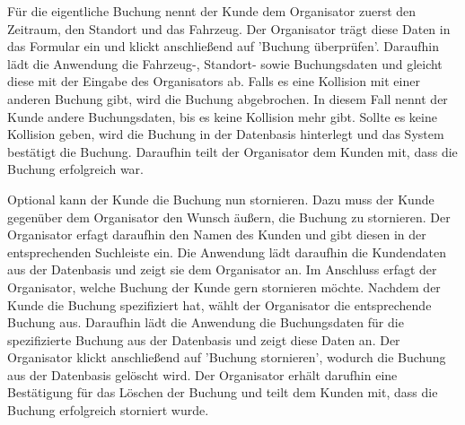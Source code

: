 Für die eigentliche Buchung nennt der Kunde dem Organisator zuerst den Zeitraum, den Standort und das Fahrzeug. Der Organisator trägt diese Daten in das Formular ein und klickt anschließend auf 'Buchung überprüfen'. Daraufhin lädt die Anwendung die Fahrzeug-, Standort- sowie Buchungsdaten und gleicht diese mit der Eingabe des Organisators ab. Falls es eine Kollision mit einer anderen Buchung gibt, wird die Buchung abgebrochen. In diesem Fall nennt der Kunde andere Buchungsdaten, bis es keine Kollision mehr gibt. Sollte es keine Kollision geben, wird die Buchung in der Datenbasis hinterlegt und das System bestätigt die Buchung. Daraufhin teilt der Organisator dem Kunden mit, dass die Buchung erfolgreich war.

Optional kann der Kunde die Buchung nun stornieren. Dazu muss der Kunde gegenüber dem Organisator den Wunsch äußern, die Buchung zu stornieren. Der Organisator erfagt daraufhin den Namen des Kunden und gibt diesen in der entsprechenden Suchleiste ein. Die Anwendung lädt daraufhin die Kundendaten aus der Datenbasis und zeigt sie dem Organisator an. Im Anschluss erfagt der Organisator, welche Buchung der Kunde gern stornieren möchte. Nachdem der Kunde die Buchung spezifiziert hat, wählt der Organisator die entsprechende Buchung aus. Daraufhin lädt die Anwendung die Buchungsdaten für die spezifizierte Buchung aus der Datenbasis und zeigt diese Daten an. Der Organisator klickt anschließend auf 'Buchung stornieren', wodurch die Buchung aus der Datenbasis gelöscht wird. Der Organisator erhält darufhin eine Bestätigung für das Löschen der Buchung und teilt dem Kunden mit, dass die Buchung erfolgreich storniert wurde. 

\newpage

